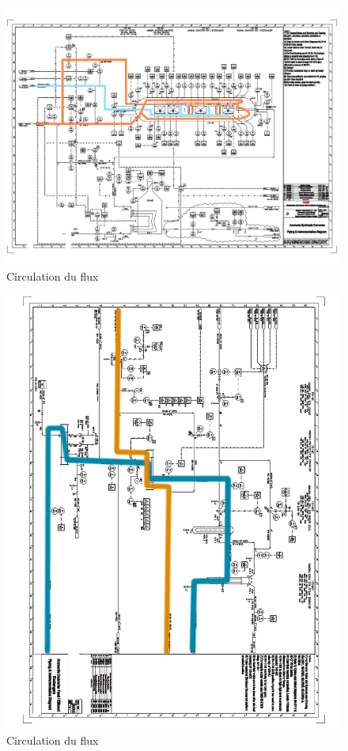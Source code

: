 \begin{figure}[h]
	\begin{center}
	\includegraphics[scale=0.5]{task4/Plan2.png}
	\end{center}

	\caption{Circulation du flux}
	\label{cir2}
\end{figure}

\begin{figure}[h]
	\begin{center}
	\includegraphics[scale=0.5]{task4/Plan2-2.png}
	\end{center}
	\caption{Circulation du flux}
	\label{cir3}
\end{figure}

